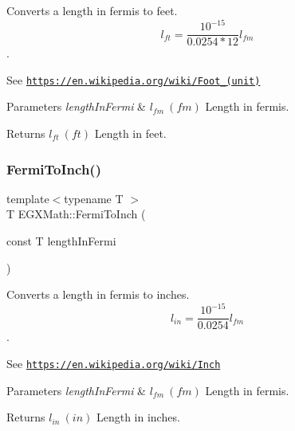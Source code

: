 Converts a length in fermis to feet. \[ l_{ft}= \frac{10^{-15}}{0.0254 * 12} l_{fm} \]. 

See \href{https://en.wikipedia.org/wiki/Foot_(unit)}{\tt https\+://en.\+wikipedia.\+org/wiki/\+Foot\+\_\+(unit)} 
\begin{DoxyParams}{Parameters}
{\em length\+In\+Fermi} & $ l_{fm}\ (fm)$ Length in fermis. \\
\hline
\end{DoxyParams}
\begin{DoxyReturn}{Returns}
$ l_{ft}\ (ft)$ Length in feet. 
\end{DoxyReturn}
\mbox{\label{group___e_g_x_math-_conversions-_length_conversions-_non-_s_i-_fermi-_imperial_gaacac85ebc839bc27889740d9ae608259}} 
\subsubsection{\texorpdfstring{Fermi\+To\+Inch()}{FermiToInch()}}
{\footnotesize\ttfamily template$<$typename T $>$ \\
T E\+G\+X\+Math\+::\+Fermi\+To\+Inch (\begin{DoxyParamCaption}\item[{const T}]{length\+In\+Fermi }\end{DoxyParamCaption})}



Converts a length in fermis to inches. \[ l_{in}= \frac{10^{-15}}{0.0254} l_{fm} \]. 

See \href{https://en.wikipedia.org/wiki/Inch}{\tt https\+://en.\+wikipedia.\+org/wiki/\+Inch} 
\begin{DoxyParams}{Parameters}
{\em length\+In\+Fermi} & $ l_{fm}\ (fm)$ Length in fermis. \\
\hline
\end{DoxyParams}
\begin{DoxyReturn}{Returns}
$ l_{in}\ (in)$ Length in inches. 
\end{DoxyReturn}
\mbox{\label{group___e_g_x_math-_conversions-_length_conversions-_non-_s_i-_fermi-_imperial_ga8559f43da08dbb3b2e09fab322904953}} 
